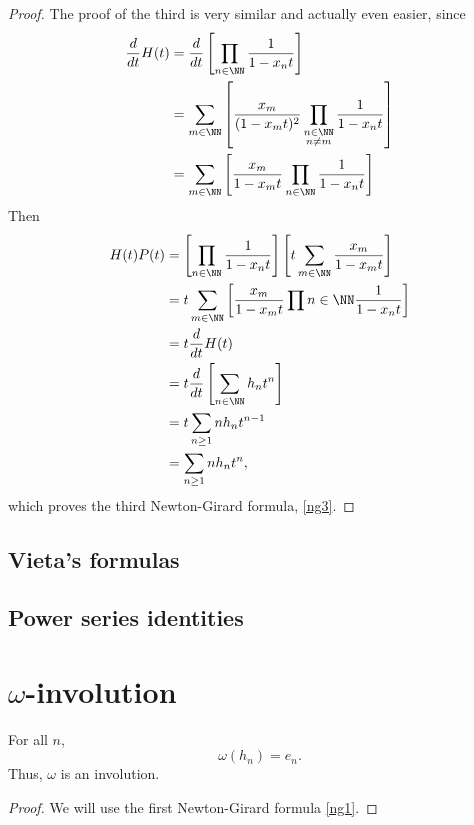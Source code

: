 \documentclass{article}
\begin{document}
\begin{proof}
    The proof of the third is very similar and actually even easier, since
    \begin{align*}
        \frac{d}{dt}H(t) &= \frac{d}{dt}\left[\prod_{n\in\NN}\frac{1}{1-x_nt}\right] \\
                         &= \sum_{m\in\NN}\left[\frac{x_m}{(1-x_mt)^2}\prod_{\substack{n\in\NN \\ n \neq m}}\frac{1}{1-x_nt}\right] \\ 
                         &= \sum_{m\in\NN}\left[\frac{x_m}{1-x_mt}\prod_{n\in\NN}\frac{1}{1-x_nt}\right]
    \end{align*}
    Then
    \begin{align*}
        H(t)P(t) &= \left[\prod_{n\in\NN}\frac{1}{1-x_nt}\right]\left[t\sum_{m\in\NN}\frac{x_m}{1-x_mt}\right] \\
                 &= t\sum_{m\in\NN}\left[\frac{x_m}{1-x_mt}\prod{n\in\NN}\frac{1}{1-x_nt}\right] \\
                 &= t\frac{d}{dt}H(t) \\
                 &= t\frac{d}{dt}\left[\sum_{n\in\NN}h_nt^n\right] \\
                 &= t\sum_{n\geq 1}nh_nt^{n-1} \\
                 &= \sum_{n\geq 1}nh_nt^n,
    \end{align*}
    which proves the third Newton-Girard formula, \eqref{ng3}.
\end{proof}

\subsection{Vieta's formulas}

\subsection{Power series identities}

\section{\texorpdfstring{$\omega$}{w}-involution}


\begin{theorem}
    For all $n$,
    \[
        \omega(h_n) = e_n.
    \]
    Thus, $\omega$ is an involution.
\end{theorem}

\begin{proof}
    We will use the first Newton-Girard formula \eqref{ng1}.
\end{proof}
\end{document}
